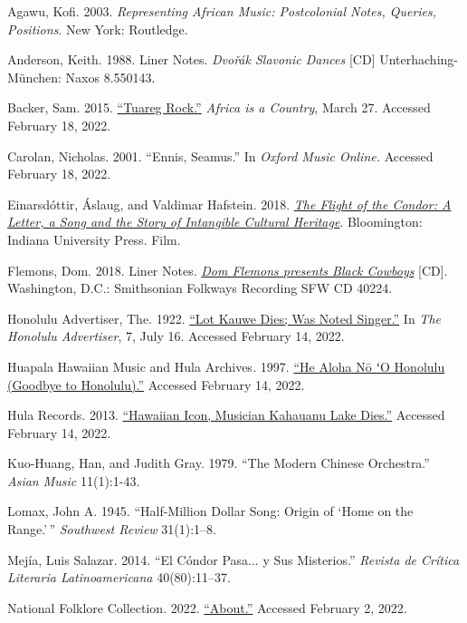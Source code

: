 \documentclass[twoside]{article}
\begin{document}
\begin{hangparas}{15pt}{1}

Agawu, Kofi. 2003. \emph{Representing African Music:
Postcolonial Notes, Queries, Positions}. New York: Routledge.

Anderson, Keith. 1988. Liner Notes. \emph{Dvořák Slavonic
Dances} {[}CD{]} Unterhaching-München: Naxos 8.550143.

Backer, Sam. 2015. \href{https://africasacountry.com/2015/03/the-unexpected-popularity-of-dire-straits-in-north-african-tuareg-communities}{``Tuareg Rock.''} \emph{Africa is a Country}, March 27. Accessed February 18, 2022.

Carolan, Nicholas. 2001. ``Ennis, Seamus.'' In \emph{Oxford
Music Online.} Accessed February 18, 2022.~

​​Einarsdóttir, Áslaug, and Valdimar Hafstein. 2018. \href{http://flightofthecondorfilm.com}{\emph{The Flight of the Condor: A Letter, a Song and the Story of Intangible Cultural Heritage}}. Bloomington: Indiana University Press. Film.

Flemons, Dom. 2018. Liner Notes. \href{https://folkways.si.edu/dom-flemons/black-cowboys}{\emph{Dom Flemons presents Black Cowboys}} {[}CD{]}. Washington, D.C.: Smithsonian Folkways Recording SFW CD 40224.

Honolulu Advertiser, The. 1922. \href{https://www.newspapers.com/clip/27904443/1922-lot-kauwe-obituary}{``Lot Kauwe Dies; Was Noted Singer.''} In \emph{The Honolulu Advertiser}, 7, July 16. Accessed February 14, 2022.

Huapala Hawaiian Music and Hula Archives\emph{.} 1997. \href{http://www.huapala.org/Hea/Healoha/_No/_Honolulu.html}{``He Aloha Nō ʻO Honolulu (Goodbye to Honolulu).''} Accessed February 14, 2022.

Hula Records. 2013. \href{http://hularecords.com//_clientData//_ao/_Ecom/obit2.html}{``Hawaiian Icon, Musician Kahauanu Lake Dies.''} Accessed February 14, 2022.

Kuo-Huang, Han, and Judith Gray. 1979. ``The Modern Chinese
Orchestra.'' \emph{Asian Music} 11(1):1-43.

Lomax, John A. 1945. ``Half-Million Dollar Song: Origin of
`Home on the Range.'\,'' \emph{Southwest Review} 31(1):1--8.

Mejía, Luis Salazar. 2014. ``El Cóndor Pasa... y Sus
Misterios.'' \emph{Revista de Crítica Literaria Latinoamericana}
40(80):11--37.

National Folklore Collection. 2022. \href{https://www.duchas.ie/en/info/cbe}{``About.''} Accessed
February 2, 2022.


\end{hangparas}
\end{document}
